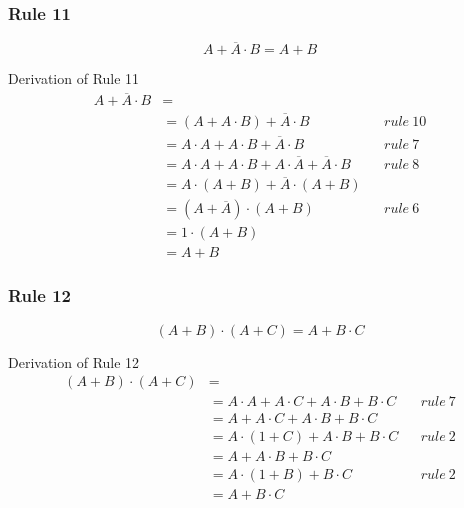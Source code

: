 \subsubsection*{Rule 11}
\[A + \overline{A}\cdot B = A + B\]
\begin{example}{Derivation of Rule 11}
\begin{align*}
A + \overline{A}\cdot B &=\\
&= (A+A\cdot B)+\overline{A}\cdot B && rule\ 10\\
&= A\cdot A + A \cdot B + \overline{A} \cdot B && rule\ 7\\
&= A\cdot A + A \cdot B + A \cdot \overline{A} + \overline{A} \cdot B && rule\ 8\\
&= A\cdot (A + B) + \overline{A}\cdot (A + B)\\
&= (A + \overline{A})\cdot (A + B) && rule\ 6\\
&= 1\cdot (A + B)\\
&= A + B
\end{align*}
\end{example}

\subsubsection*{Rule 12}
\[(A+B)\cdot (A+C) = A+ B \cdot C\]
\begin{example}{Derivation of Rule 12}
\begin{align*}
(A+B) \cdot (A+C) &=\\
&= A\cdot A + A \cdot C + A\cdot B + B\cdot C && rule\ 7\\
&= A + A\cdot C + A\cdot B + B \cdot C\\
&= A\cdot (1+C) + A\cdot B + B \cdot C && rule\ 2\\
&= A + A \cdot B + B \cdot C\\
&= A \cdot (1 + B) + B\cdot C && rule\ 2\\
&= A+ B\cdot C
\end{align*}
\end{example}